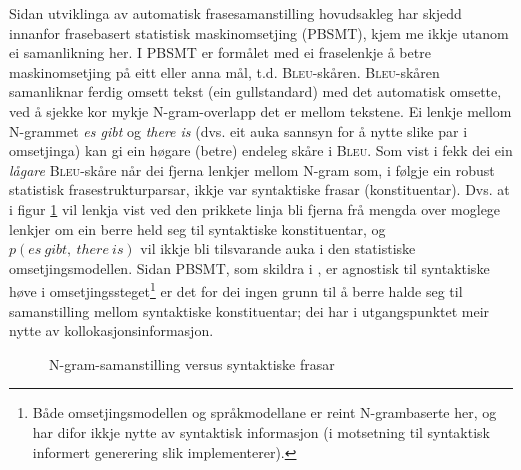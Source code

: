 \documentclass[12pt,a4paper,oneside,draft]{report}
\newcommand{\Bleu}{\textsc{Bleu}}
\begin{document}
Sidan utviklinga av automatisk frasesamanstilling hovudsakleg har
 skjedd innanfor frasebasert statistisk maskinomsetjing (PBSMT), kjem
 me ikkje utanom ei samanlikning her. I PBSMT er formålet med ei
 fraselenkje å betre maskinomsetjing på eitt eller anna mål,
 t.d. \Bleu-skåren. \Bleu-skåren samanliknar ferdig omsett tekst (ein
 gullstandard) med det automatisk omsette, ved å sjekke kor mykje
 N-gram-overlapp det er mellom tekstene. Ei lenkje mellom N-grammet
 \emph{es gibt} og \emph{there is} (dvs. eit auka sannsyn for å nytte slike par
 i omsetjinga) kan gi ein høgare (betre) endeleg skåre i \Bleu. Som
 vist i \citet{koehn2003spb} fekk dei ein \emph{lågare} \Bleu-skåre når dei
 fjerna lenkjer mellom N-gram som, i følgje ein robust
 statistisk frasestrukturparsar, ikkje var syntaktiske frasar
 (konstituentar). Dvs. at i figur \ref{fig:ikkjenode} vil lenkja vist
 ved den prikkete linja bli fjerna frå mengda over moglege lenkjer om
 ein berre held seg til syntaktiske konstituentar, og
 $p(es~gibt,~there~is)$ vil ikkje bli tilsvarande auka i den
 statistiske omsetjingsmodellen. Sidan PBSMT, som skildra i
 \citet{koehn2003spb}, er agnostisk til syntaktiske høve i
 omsetjingssteget\footnote{Både omsetjingsmodellen og språkmodellane er reint
      N-grambaserte her, og har difor ikkje nytte av syntaktisk
      informasjon (i motsetning til syntaktisk informert generering
      slik \citet{riezler2006gmt} implementerer). } er det for dei ingen grunn til å berre halde
 seg til samanstilling mellom syntaktiske konstituentar; dei har i
 utgangspunktet meir nytte av kollokasjonsinformasjon.

\begin{figure}[htp]
   \centering
   \caption{N-gram-samanstilling versus syntaktiske frasar}
    \label{fig:ikkjenode}
  \end{figure}
\end{document}
